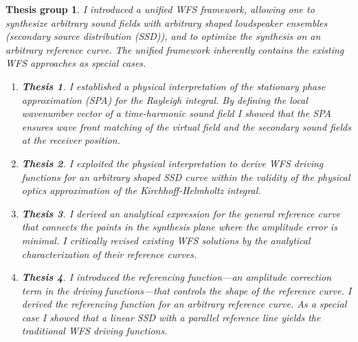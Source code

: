 \documentclass[10pt,twoside]{article}
\theoremstyle{thesisgroupstyle}
\newtheorem{thesisgroup}{Thesis group}
\newtheorem{thesis}{Thesis}[thesisgroup]
\begin{document}
\begin{thesisgroup}
I introduced a unified WFS framework, allowing one to synthesize arbitrary sound fields with arbitrary shaped loudspeaker ensembles (secondary source distribution (SSD)), and to optimize the synthesis on an arbitrary reference curve. 
The unified framework inherently contains the existing WFS approaches as special cases.
\begin{enumerate}
\item[] \vspace{-7mm}\begin{thesis}I established a physical interpretation of the stationary phase approximation (SPA) for the Rayleigh integral.
By defining the local wavenumber vector of a time-harmonic sound field I showed that the SPA ensures wave front matching of the virtual field and the secondary sound fields at the receiver position.\end{thesis}
\item[] \vspace{-7mm}\begin{thesis}I exploited the physical interpretation to derive WFS driving functions for an arbitrary shaped SSD curve within the validity of the physical optics approximation of the Kirchhoff-Helmholtz integral.\end{thesis}
\item[] \vspace{-7mm}\begin{thesis}I derived an analytical expression for the general \emph{reference curve} that connects the points in the synthesis plane where the amplitude error is minimal.
I critically revised existing WFS solutions by the analytical characterization of their reference curves.\end{thesis}
\item[] \vspace{-7mm}\begin{thesis}I introduced the \emph{referencing function}---an amplitude correction term in the driving functions---that controls the shape of the reference curve.
I derived the referencing function for an arbitrary reference curve.
As a special case I showed that a linear SSD with a parallel reference line yields the traditional WFS driving functions.\end{thesis}
\end{enumerate}
\end{thesisgroup}
\end{document}
